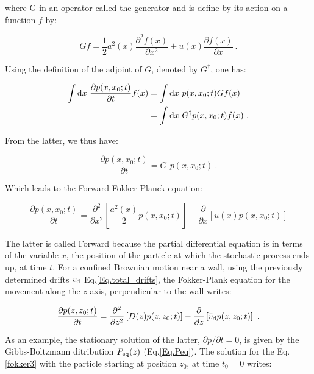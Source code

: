 where G in an operator called the generator and is define by its action on a function $f$ by:

\begin{equation}
	Gf = \frac{1}{2} a^2 (x) \frac{\partial ^2 f(x)}{\partial x^2} + u(x) \frac{\partial f(x)}{\partial x} ~.
\end{equation}

Using the definition of the adjoint of $G$, denoted by $G ^\dagger$, one has:


\begin{equation}
	\begin{aligned}
	\int \textnormal{d} x ~\frac{\partial p(x, x_0 ; t) }{\partial t} f(x) &= \int \textnormal{d}x ~ p(x, x_0 ; t) G f(x) \\
	&= \int \textnormal{d}x ~  G ^\dagger p(x, x_0 ; t) f(x) ~.
	\end{aligned}
\end{equation}

From the latter, we thus have:

\begin{equation}
	\frac{\partial p(x, x_0 ; t)}{\partial t} = G^\dagger p(x, x_0 ; t) ~.
	\label{fokker3}
\end{equation}

Which leads to the Forward-Fokker-Planck equation:

\begin{equation}
	\frac{\partial p(x, x_0 ; t)}{\partial t }= \frac{\partial ^2}{\partial x^2} \left[\frac{a^2 (x)}{2}p(x, x_0 ; t)\right] - \frac{\partial}{\partial x} \left[u(x) p(x, x_0 ; t)\right]
	\label{Eq.Forward_Fokker_plank}
\end{equation}

The latter is called Forward because the partial differential equation is in terms of the variable $x$, the position of the particle at which the stochastic process ends up, at time $t$. For a confined Brownian motion near a wall, using the previously determined drifts $\bar{v}_\textnormal{d}$ Eq.\ref{Eq.total_drifts}, the Fokker-Plank equation for the movement along the $z$ axis, perpendicular to the wall writes:

\begin{equation}
	\frac{\partial p(z, z_0 ; t)}{\partial t} = \frac{\partial ^2}{\partial z ^2} \left[ D(z)  p(z, z_0 ; t) \right]   -  \frac{\partial }{\partial z} \left[\bar{v}_\textnormal{d} p(z, z_0 ; t)\right] ~.
\end{equation}

As an example, the stationary solution of the latter, $\partial p / \partial t = 0$, is given by the Gibbs-Boltzmann ditribution $P_\textnormal{eq}(z) $ (Eq.\ref{Eq.Peq}). The solution for the Eq.\ref{fokker3} with the particle starting at position $z_0$, at time $t_0 = 0$ writes:

